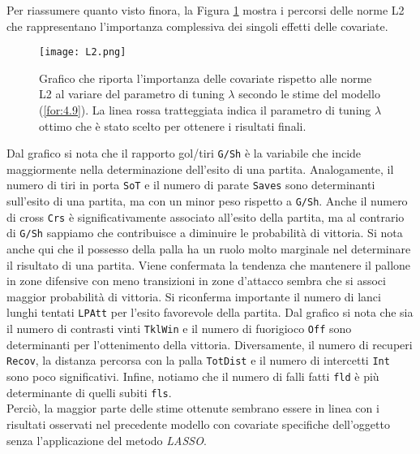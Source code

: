 Per riassumere quanto visto finora, la Figura \ref{fig:l2BTCL} mostra i percorsi delle norme L2 che rappresentano l'importanza complessiva dei singoli effetti delle covariate.

\begin{figure}[htbp]
	\begin{center}
		\texttt{[image: L2.png]}
		\caption{Grafico che riporta l'importanza delle covariate rispetto alle norme L2 al variare del parametro di tuning $\lambda$ secondo le stime del modello (\ref{for:4.9}). La linea rossa tratteggiata indica il parametro di tuning $\lambda$ ottimo che è stato scelto per ottenere i risultati finali.} \label{fig:l2BTCL}
	\end{center}
\end{figure}
Dal grafico si nota che il rapporto gol/tiri \texttt{G/Sh} è la variabile che incide maggiormente nella determinazione dell'esito di una partita. Analogamente, il numero di tiri in porta \texttt{SoT} e il numero di parate \texttt{Saves} sono determinanti sull'esito di una partita, ma con un minor peso rispetto a \texttt{G/Sh}. Anche il numero di cross \texttt{Crs} è significativamente associato all'esito della partita, ma al contrario di \texttt{G/Sh} sappiamo che contribuisce a diminuire le probabilità di vittoria. Si nota anche qui che il possesso della palla ha un ruolo molto marginale nel determinare il risultato di una partita. Viene confermata la tendenza che mantenere il pallone in zone difensive con meno transizioni in zone d'attacco sembra che si associ maggior probabilità di vittoria. Si riconferma importante il numero di lanci lunghi tentati \texttt{LPAtt} per l'esito favorevole della partita. Dal grafico si nota che sia il numero di contrasti vinti \texttt{TklWin} e il numero di fuorigioco \texttt{Off} sono determinanti per l'ottenimento della vittoria. Diversamente, il numero di recuperi \texttt{Recov}, la distanza percorsa con la palla \texttt{TotDist} e il numero di intercetti \texttt{Int} sono poco significativi. Infine, notiamo che il numero di falli fatti \texttt{fld} è più determinante di quelli subiti \texttt{fls}.\\
Perciò, la maggior parte delle stime ottenute sembrano essere in linea con i risultati osservati nel precedente modello con covariate specifiche dell'oggetto senza l'applicazione del metodo \emph{LASSO}.

